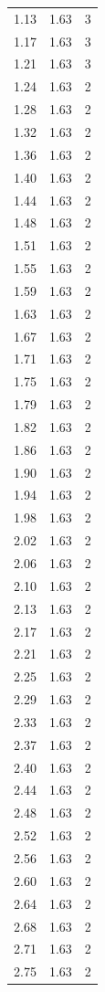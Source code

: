 \begin{longtable}{lrr}
  1.13 & 1.63 & 3 \\
  1.17 & 1.63 & 3 \\
  1.21 & 1.63 & 3 \\
  1.24 & 1.63 & 2 \\
  1.28 & 1.63 & 2 \\
  1.32 & 1.63 & 2 \\
  1.36 & 1.63 & 2 \\
  1.40 & 1.63 & 2 \\
  1.44 & 1.63 & 2 \\
  1.48 & 1.63 & 2 \\
  1.51 & 1.63 & 2 \\
  1.55 & 1.63 & 2 \\
  1.59 & 1.63 & 2 \\
  1.63 & 1.63 & 2 \\
  1.67 & 1.63 & 2 \\
  1.71 & 1.63 & 2 \\
  1.75 & 1.63 & 2 \\
  1.79 & 1.63 & 2 \\
  1.82 & 1.63 & 2 \\
  1.86 & 1.63 & 2 \\
  1.90 & 1.63 & 2 \\
  1.94 & 1.63 & 2 \\
  1.98 & 1.63 & 2 \\
  2.02 & 1.63 & 2 \\
  2.06 & 1.63 & 2 \\
  2.10 & 1.63 & 2 \\
  2.13 & 1.63 & 2 \\
  2.17 & 1.63 & 2 \\
  2.21 & 1.63 & 2 \\
  2.25 & 1.63 & 2 \\
  2.29 & 1.63 & 2 \\
  2.33 & 1.63 & 2 \\
  2.37 & 1.63 & 2 \\
  2.40 & 1.63 & 2 \\
  2.44 & 1.63 & 2 \\
  2.48 & 1.63 & 2 \\
  2.52 & 1.63 & 2 \\
  2.56 & 1.63 & 2 \\
  2.60 & 1.63 & 2 \\
  2.64 & 1.63 & 2 \\
  2.68 & 1.63 & 2 \\
  2.71 & 1.63 & 2 \\
  2.75 & 1.63 & 2 \\

\end{longtable}
